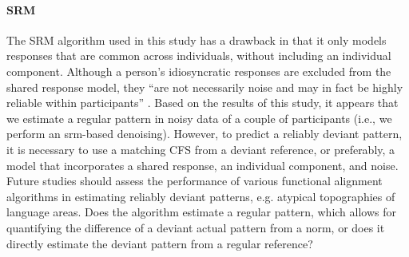 

\paragraph{SRM}



The SRM algorithm used in this study has a drawback in that it only models
responses that are common across individuals, without including an individual
component.
%
Although a person's idiosyncratic responses are excluded from the shared
response model, they ``are not necessarily noise and may in fact be highly
reliable within participants'' \citep{cohen2017computational}.
%
Based on the results of this study, it appears that we estimate a regular
pattern in noisy data of a couple of participants  (i.e., we perform an
\ac{srm}-based denoising).
%
However, to predict a reliably deviant pattern, it is necessary to use a
matching CFS from a deviant reference, or preferably, a model that incorporates
a shared response, an individual component, and noise.
%
Future studies should assess the performance of various functional alignment
algorithms in estimating reliably deviant patterns, e.g. atypical topographies
of language areas.
%
Does the algorithm estimate a regular pattern, which allows for quantifying the
difference of a deviant actual pattern from a norm, or does it directly estimate
the deviant pattern from a regular reference?







